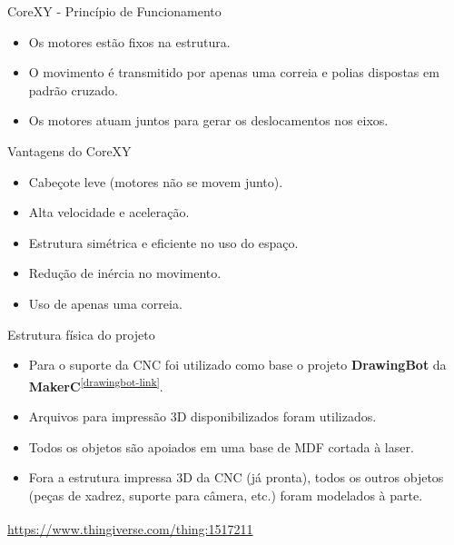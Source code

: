 \documentclass{beamer}
\begin{document}
\begin{frame}{CoreXY - Princípio de Funcionamento}
\begin{itemize}
  \item Os motores estão fixos na estrutura.
  \item O movimento é transmitido por apenas uma correia e polias dispostas em padrão cruzado.
  \item Os motores atuam juntos para gerar os deslocamentos nos eixos.
\end{itemize}
\end{frame}

\begin{frame}{Vantagens do CoreXY}
\begin{itemize}
  \item Cabeçote leve (motores não se movem junto).
  \item Alta velocidade e aceleração.
  \item Estrutura simétrica e eficiente no uso do espaço.
  \item Redução de inércia no movimento.
  \item Uso de apenas uma correia.
\end{itemize}
\end{frame}

\begin{frame}{Estrutura física do projeto}
  \begin{itemize}
    \item Para o suporte da CNC foi utilizado como base o projeto \textbf{DrawingBot} da \textbf{MakerC}\textsuperscript{\ref{drawingbot-link}}.
    \item Arquivos para impressão 3D disponibilizados foram utilizados.
    \item Todos os objetos são apoiados em uma base de MDF cortada à laser.
    \item Fora a estrutura impressa 3D da CNC (já pronta), todos os outros objetos (peças de xadrez, suporte para câmera, etc.) foram modelados à parte.
  \end{itemize}

  \vfill
  \begin{flushright}
    \scriptsize \textsuperscript{\label{drawingbot-link}\thefootnote} \href{https://www.thingiverse.com/thing:1517211}{https://www.thingiverse.com/thing:1517211}
  \end{flushright}
\end{frame}
\end{document}

